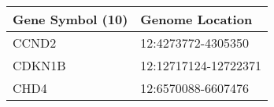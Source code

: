 \begin{tabular}{ll}
\toprule
Gene Symbol (10) &      Genome Location \\
\midrule
           CCND2 &   12:4273772-4305350 \\
          CDKN1B & 12:12717124-12722371 \\
            CHD4 &   12:6570088-6607476 \\
\bottomrule
\end{tabular}
